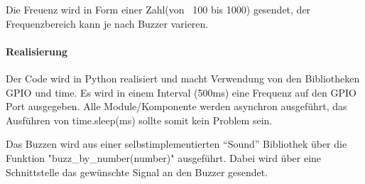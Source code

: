 \documentclass[../../main.tex]{subfiles}
\begin{document}
Die Freuenz wird in Form einer Zahl(von ~100 bis 1000) gesendet, der Frequenzbereich kann je nach Buzzer varieren.

\paragraph{Realisierung}
Der Code wird in Python realisiert und macht Verwendung von den Bibliotheken GPIO und time. Es wird in einem Interval (500ms) eine Frequenz auf den GPIO Port ausgegeben. Alle Module/Komponente werden asynchron ausgeführt, das Ausführen von time.sleep(ms) sollte somit kein Problem sein.

Das Buzzen wird aus einer selbstimplementierten ``Sound'' Bibliothek über die Funktion "buzz\_by\_number(number)" ausgeführt. Dabei wird über eine Schnittstelle das gewünschte Signal an den Buzzer gesendet.
\end{document}
